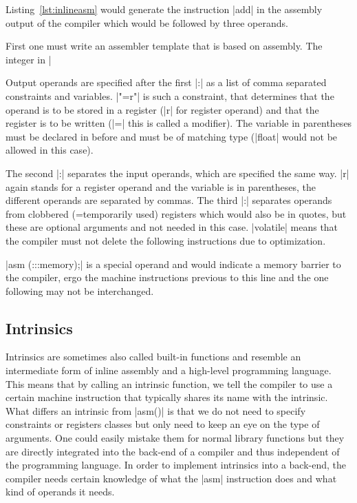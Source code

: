 {Listing~\ref{lst:inlineasm} would generate the instruction |add| in the assembly output of the compiler which would be followed by three operands.

First one must write an assembler template that is based on assembly.
The integer in |%

Output operands are specified after the first |:| as a list of comma separated constraints and variables.
|"=r"| is such a constraint, that determines that the operand is to be stored in a register (|r| for register operand) and that the register is to be written (|=| this is called a modifier).
The variable in parentheses must be declared in before and must be of matching type (|float| would not be allowed in this case).

The second |:| separates the input operands, which are specified the same way.
|r| again stands for a register operand and the variable is in parentheses, the different operands are separated by commas.
The third |:| separates operands from clobbered (=temporarily used) registers which would also be in quotes, but these are optional arguments and not needed in this case.
|volatile| means that the compiler must not delete the following instructions due to optimization.

|asm (:::memory);| is a special operand and would indicate a memory barrier to the compiler, ergo the machine instructions previous to this line and the one following may not be interchanged.

\subsection{Intrinsics}
Intrinsics are sometimes also called built-in functions and resemble an intermediate form of inline assembly and a high-level programming language.
This means that by calling an intrinsic function, we tell the compiler to use a certain machine instruction that typically shares its name with the intrinsic.
What differs an intrinsic from |asm()| is that we do not need to specify constraints or registers classes but only need to keep an eye on the type of arguments.
One could easily mistake them for normal library functions but they are directly integrated into the back-end of a compiler and thus independent of the programming language.
In order to implement intrinsics into a back-end, the compiler needs certain knowledge of what the |asm| instruction does and what kind of operands it needs.

}
